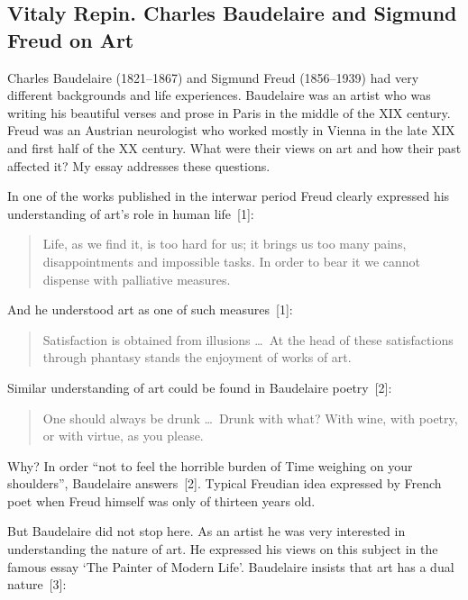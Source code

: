 
\subsection*{Vitaly Repin. Charles Baudelaire and Sigmund Freud on Art}


\begin{multicols}{2}
Charles Baudelaire (1821--1867) and Sigmund Freud (1856--1939) had very different backgrounds and life experiences.
Baudelaire was an artist who was writing his beautiful verses and prose in Paris in the middle of the XIX century.
Freud was an Austrian neurologist who worked mostly in Vienna in the late XIX and first half of the XX century.
What were their views on art and how their past affected it? My essay addresses these questions.

In one of the works published in the interwar period Freud clearly expressed his understanding of art's role in human life~[1]:

\begin{quote}
	Life, as we find it, is too hard for us; it brings us too many pains, disappointments and impossible tasks. In order to bear it we cannot dispense with palliative measures.
\end{quote}

And he understood art as one of such measures~[1]:

\begin{quote}
	Satisfaction is obtained from illusions \dots\ At the head of these satisfactions through phantasy stands
	the enjoyment of works of art.
\end{quote}

Similar understanding of art could be found in Baudelaire poetry~[2]:

\begin{quote}
	One should always be drunk \dots\ Drunk with what? With wine, with poetry, or with virtue, as you please.
\end{quote}

Why? In order ``not to feel the horrible burden of Time weighing on your shoulders'', Baudelaire answers~[2].
Typical Freudian idea expressed by French poet when Freud himself was only of thirteen years old.

But Baudelaire did not stop here. As an artist he was very interested in understanding the nature of art.
He expressed his views on this subject in the famous essay ‘The Painter of Modern Life’. Baudelaire insists that
art has a dual nature~[3]:


\end{multicols}
